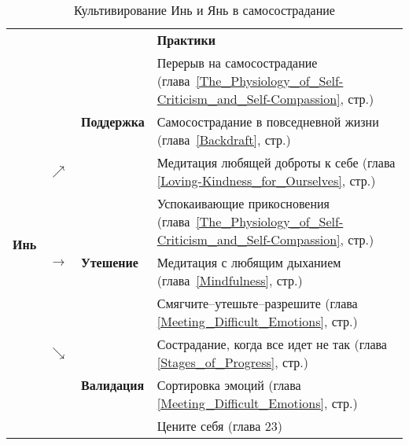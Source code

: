 \begin{table}[!h]
	\begin{center}
		\caption{Культивирование Инь и Янь в самосострадание}\label{tab:Yin_and_Yang}
		\setlength{\extrarowheight}{1mm}
		\begin{tabular}{p{1.2cm}p{3mm}p{2.6cm}||p{9.9cm}}
			\multicolumn{3}{r}{ } & {\large \textbf{Практики}}\\[1mm]
			\cline{3-4}
			\multirow{9}{*}{{\LARGE\textbf{Инь}}} &  & \multirow{3}{*}{\textbf{Поддержка}} & {\small Перерыв на самосострадание (глава~\ref{The_Physiology_of_Self-Criticism_and_Self-Compassion}, стр.\:\pageref{IP:Self-Compassion_Break})}\\ 
			&  &  & {\small Самосострадание в повседневной жизни (глава~\ref{Backdraft}, стр.\:\pageref{IP:Self-Compassion_in_Daily_Life})}\\ 
			& $\nearrow$ &  &{\small  Медитация любящей доброты к себе (глава \ref{Loving-Kindness_for_Ourselves}, стр.\:\pageref{M:Loving-Kindness_for_Ourselves})}\\ \cline{3-4}
			& \multirow{3}{*}{\textbf{$\rightarrow$}} & \multirow{3}{*}{\textbf{Утешение}} & {\small Успокаивающие прикосновения (глава~\ref{The_Physiology_of_Self-Criticism_and_Self-Compassion}, стр.\:\pageref{IP:Soothing_Touch})}\\
			&   &   & {\small Медитация с любящим дыханием (глава~\ref{Mindfulness}, стр.\:\pageref{medit:Affectionate_Breathing})}\\
			&   &   & {\small Смягчите--утешьте--разрешите (глава \ref{Meeting_Difficult_Emotions}, стр.\:\pageref{IP:Soften_Soothe_Allow})}\\ \cline{3-4}
			& $\searrow$ & \multirow{3}{*}{\textbf{Валидация}} &{\small  Сострадание, когда все идет не так (глава \ref{Stages_of_Progress}, стр.\:\pageref{Being_a_Compassionate_Mess})}\\
			&   &   & {\small Сортировка эмоций (глава \ref{Meeting_Difficult_Emotions}, стр.\:\pageref{IP:Working_with_Difficult_Emotions})}\\
			&   &   & {\small Цените себя (глава 23)}\\ \cline{3-4}
		\end{tabular}
		\setlength{\extrarowheight}{0mm}
	\end{center}
\end{table} 
